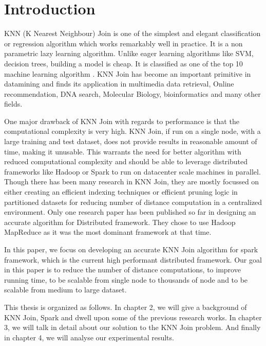 \chapter{Introduction}


KNN (K Nearest Neighbour) Join is one of the simplest and elegant
classification or regression algorithm which works remarkably well in
practice. It is a non parametric lazy learning algorithm. Unlike eager
learning algorithms like SVM, decision trees, building a model is
cheap. It is
classified as one of the top 10 machine learning algorithm \cite{wu_top_2008}. KNN Join
has become an important primitive in datamining and
finds its application in multimedia data retrieval, Online
recommendation, DNA search,
Molecular Biology, bioinformatics  and
many other fields.

\medskip

One major drawback of KNN Join with regards to performance is that the computational complexity is
very high. KNN Join, if run on a single node, with a
large training and test dataset, does not provide results in reasonable amount of time, making it
unusable. This warrants the need for better algorithm with
reduced computational complexity and should be able to
leverage distributed frameworks like Hadoop \cite{hadoop_mr} or Spark
\cite{apache_spark} to run on datacenter scale machines in parallel.
Though there has been many research in KNN Join, they are mostly focussed on either creating
an efficient indexing techniques or efficient pruning logic in
partitioned datasets for reducing
number of distance computation in a centralized environment.
Only one
research paper \cite{lu_efficient_2012} has been published so far in
designing an accurate algorithm
for Distributed framework. They chose to use Hadoop MapReduce as it
was the most dominant framework at that time.


In this paper, we focus on
developing an accurate KNN Join algorithm for spark framework, which is
the current high performant distributed framework. Our goal in this
paper is to reduce the number of distance computations, to improve running time,
to be scalable from single node to thousands of node and to be scalable from
medium to large dataset.

This thesis is organized as follows. In chapter 2, we will give a
background of KNN Join, Spark and dwell upon some of the previous
research works. In chapter 3, we will talk in detail about our
solution to the KNN Join problem. And finally in chapter 4, we will analyse our
experimental results.
